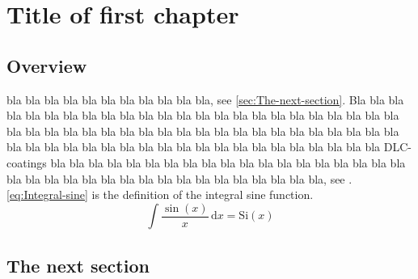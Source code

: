 
\lhead[\chaptername~\thechapter]{\rightmark}


\rhead[\leftmark]{}


\lfoot[\thepage]{}


\cfoot{}


\rfoot[]{\thepage}


\chapter{Title of first chapter}


\section{Overview}

bla bla bla bla bla bla bla bla bla bla bla, see \ref{sec:The-next-section}.
Bla bla bla bla bla bla bla bla bla bla bla bla bla bla bla bla bla
bla bla bla bla bla bla bla bla bla bla bla bla bla bla bla bla bla
bla bla bla bla bla bla bla bla bla bla bla bla bla bla bla bla bla
bla bla bla bla bla bla bla bla bla bla bla bla bla bla DLC-coatings
bla bla bla bla bla bla bla bla bla bla bla bla bla bla bla bla bla
bla bla bla bla bla bla bla bla bla bla bla bla bla bla bla bla bla
bla bla, see \cite{test1}. \eqref{eq:Integral-sine} is the definition
of the integral sine function.
\begin{equation}
\int\frac{\sin(x)}{x}\,\mathrm{d}x=\mathrm{Si}(x)\label{eq:Integral-sine}
\end{equation}



\section{The next section\label{sec:The-next-section}}


